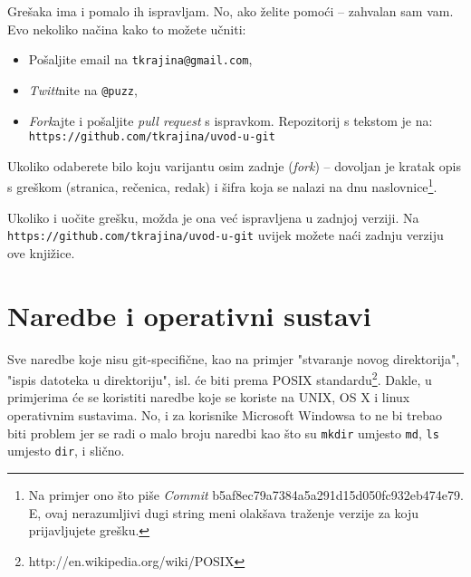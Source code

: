 Grešaka ima i pomalo ih ispravljam.
No, ako želite pomoći -- zahvalan sam vam.
Evo nekoliko načina kako to možete učniti:

\begin{itemize}
    \item Pošaljite email na \verb+tkrajina@gmail.com+,
    \item \emph{Twitt}nite na \verb+@puzz+,
    \item \emph{Fork}ajte i pošaljite \emph{pull request} s ispravkom. Repozitorij s tekstom je na: \\ \verb+https://github.com/tkrajina/uvod-u-git+
\end{itemize}

Ukoliko odaberete bilo koju varijantu osim zadnje (\emph{fork}) -- dovoljan je kratak opis s greškom (stranica, rečenica, redak) i šifra koja se nalazi na dnu naslovnice\footnote{Na primjer ono što piše \emph{Commit} b5af8ec79a7384a5a291d15d050fc932eb474e79. E, ovaj nerazumljivi dugi string meni olakšava traženje verzije za koju prijavljujete grešku.}.

Ukoliko i uočite grešku, možda je ona već ispravljena u zadnjoj verziji. 
Na \\ \verb+https://github.com/tkrajina/uvod-u-git+ uvijek možete naći zadnju verziju ove knjižice.

\section*{Naredbe i operativni sustavi}

Sve naredbe koje nisu git-specifične, kao na primjer "stvaranje novog direktorija", "ispis datoteka u direktoriju", isl. će biti prema POSIX standardu\footnote{http://en.wikipedia.org/wiki/POSIX}.
Dakle, u primjerima će se koristiti naredbe koje se koriste na UNIX, OS  X i linux operativnim sustavima. 
No, i za korisnike Microsoft Windowsa to ne bi trebao biti problem jer se radi o malo broju naredbi kao što su \verb+mkdir+ umjesto \verb+md+, \verb+ls+ umjesto \verb+dir+, i slično.
